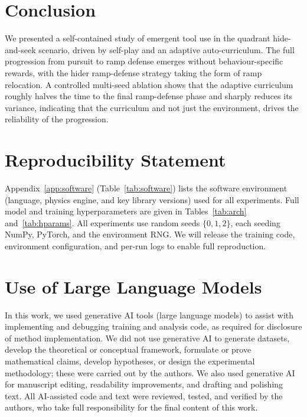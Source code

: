 \documentclass{article}
\begin{document}
\section{Conclusion}
We presented a self-contained study of emergent tool use in the quadrant
hide-and-seek scenario, driven by self-play and an adaptive auto-curriculum. The
full progression from pursuit to ramp defense emerges without behaviour-specific
rewards, with the hider ramp-defense strategy taking the form of ramp relocation.
A controlled multi-seed ablation shows that the adaptive curriculum roughly halves
the time to the final ramp-defense phase and sharply reduces its variance,
indicating that the curriculum and not just the environment, drives the reliability
of the progression.

\section*{Reproducibility Statement}
Appendix~\ref{app:software} (Table~\ref{tab:software}) lists the software
environment (language, physics engine, and key library versions) used for all
experiments. Full model and training hyperparameters are given in
Tables~\ref{tab:arch} and~\ref{tab:hparams}. All experiments use random seeds
$\{0,1,2\}$, each seeding NumPy, PyTorch, and the environment RNG. We will release
the training code, environment configuration, and per-run logs to enable full
reproduction.

\section*{Use of Large Language Models}
In this work, we used generative AI tools (large language models) to assist with implementing and debugging training and analysis code, as required for disclosure of method implementation. We did not use generative AI to generate datasets, develop the theoretical or conceptual framework, formulate or prove mathematical claims, develop hypotheses, or design the experimental methodology; these were carried out by the authors. We also used generative AI for manuscript editing, readability improvements, and drafting and polishing text. All AI-assisted code and text were reviewed, tested, and verified by the authors, who take full responsibility for the final content of this work.




\newpage
\appendix
\end{document}
